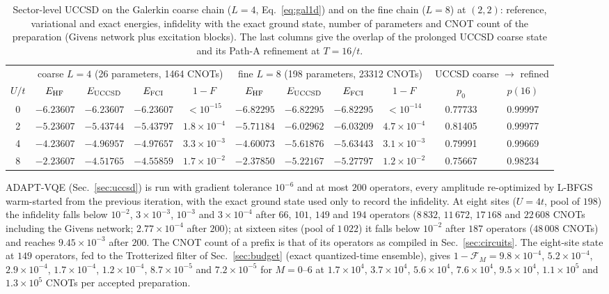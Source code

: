 \documentclass[a4paper,11pt,noarxiv]{quantumarticle}
\begin{document}
\begin{table}[t]
  \caption{Sector-level UCCSD on the Galerkin coarse chain ($L=4$,
  Eq.~\eqref{eq:gal1d}) and on the fine chain ($L=8$) at $(2,2)$:
  reference, variational and exact energies, infidelity with the exact
  ground state, number of parameters and CNOT count of the preparation
  (Givens network plus excitation blocks).  The last columns give the
  overlap of the prolonged UCCSD coarse state and its Path-A refinement at
  $T=16/t$.}
  \label{tab:uccsd}
  \centering\scriptsize
  \setlength{\tabcolsep}{3pt}
  \begin{tabular}{c|cccc|cccc|cc}
  \toprule
  & \multicolumn{4}{c|}{coarse $L=4$ (26 parameters, 1464 CNOTs)} & \multicolumn{4}{c|}{fine $L=8$ (198 parameters, 23312 CNOTs)} & \multicolumn{2}{c}{UCCSD coarse $\to$ refined}\\
  $U/t$ & $E_{\rm HF}$ & $E_{\rm UCCSD}$ & $E_{\rm FCI}$ & $1-F$ & $E_{\rm HF}$ & $E_{\rm UCCSD}$ & $E_{\rm FCI}$ & $1-F$ & $p_0$ & $p(16)$\\
  \midrule
  0 & $-6.23607$ & $-6.23607$ & $-6.23607$ & $<10^{-15}$ & $-6.82295$ & $-6.82295$ & $-6.82295$ & $<10^{-14}$ & 0.77733 & 0.99997\\
  2 & $-5.23607$ & $-5.43744$ & $-5.43797$ & $1.8\times10^{-4}$ & $-5.71184$ & $-6.02962$ & $-6.03209$ & $4.7\times10^{-4}$ & 0.81405 & 0.99977\\
  4 & $-4.23607$ & $-4.96957$ & $-4.97657$ & $3.3\times10^{-3}$ & $-4.60073$ & $-5.61876$ & $-5.63443$ & $3.1\times10^{-3}$ & 0.79991 & 0.99669\\
  8 & $-2.23607$ & $-4.51765$ & $-4.55859$ & $1.7\times10^{-2}$ & $-2.37850$ & $-5.22167$ & $-5.27797$ & $1.2\times10^{-2}$ & 0.75667 & 0.98234\\
  \bottomrule
  \end{tabular}
\end{table}

ADAPT-VQE (Sec.~\ref{sec:uccsd}) is run with gradient tolerance $10^{-6}$
and at most $200$ operators, every amplitude re-optimized by L-BFGS
warm-started from the previous iteration, with the exact ground state used
only to record the infidelity.  At eight sites ($U=4t$, pool of $198$) the
infidelity falls below $10^{-2}$, $3\times10^{-3}$, $10^{-3}$ and
$3\times10^{-4}$ after $66$, $101$, $149$ and $194$ operators ($8\,832$,
$11\,672$, $17\,168$ and $22\,608$ CNOTs including the Givens network;
$2.77\times10^{-4}$ after $200$); at sixteen sites (pool of $1\,022$) it
falls below $10^{-2}$ after $187$ operators ($48\,008$ CNOTs) and reaches
$9.45\times10^{-3}$ after $200$.  The CNOT count of a prefix is that of
its operators as compiled in Sec.~\ref{sec:circuits}.  The eight-site
state at $149$ operators, fed to the Trotterized filter of
Sec.~\ref{sec:budget} (exact quantized-time ensemble), gives
$1-\mathcal F_M=9.8\times10^{-4}$, $5.2\times10^{-4}$,
$2.9\times10^{-4}$, $1.7\times10^{-4}$, $1.2\times10^{-4}$,
$8.7\times10^{-5}$ and $7.2\times10^{-5}$ for $M=0$--$6$ at
$1.7\times10^4$, $3.7\times10^4$, $5.6\times10^4$, $7.6\times10^4$,
$9.5\times10^4$, $1.1\times10^5$ and $1.3\times10^5$ CNOTs per accepted
preparation.
\end{document}
